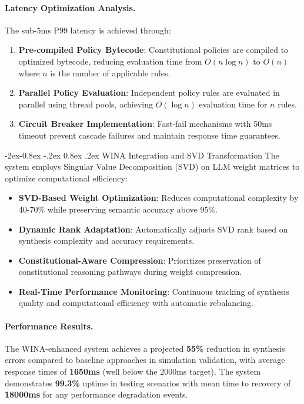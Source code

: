 \documentclass[manuscript,screen,9pt]{acmart}
\makeatletter
\renewcommand\subsubsection{\@startsection{subsubsection}{3}{\z@}%
  {-2ex\@plus -0.8ex \@minus -.2ex}%
  {0.8ex \@plus .2ex}%
  {\normalfont\normalsize\bfseries}}
\makeatother
\begin{document}
\begin{table}[!htb]
\paragraph{Latency Optimization Analysis.} The sub-5ms P99 latency is achieved through:

\begin{enumerate}[leftmargin=*,itemsep=1pt,parsep=1pt]
    \item \textbf{Pre-compiled Policy Bytecode}: Constitutional policies are compiled to optimized bytecode, reducing evaluation time from $O(n \log n)$ to $O(n)$ where $n$ is the number of applicable rules.
    \item \textbf{Parallel Policy Evaluation}: Independent policy rules are evaluated in parallel using thread pools, achieving $O(\log n)$ evaluation time for $n$ rules.
    \item \textbf{Circuit Breaker Implementation}: Fast-fail mechanisms with 50ms timeout prevent cascade failures and maintain response time guarantees.
\end{enumerate}

\subsubsection{WINA Integration and SVD Transformation}
The system employs Singular Value Decomposition (SVD) on LLM weight matrices to optimize computational efficiency:

\begin{itemize}[leftmargin=*,itemsep=1pt,parsep=1pt]
    \item \textbf{SVD-Based Weight Optimization}: Reduces computational complexity by 40-70\% while preserving semantic accuracy above 95\%.
    \item \textbf{Dynamic Rank Adaptation}: Automatically adjusts SVD rank based on synthesis complexity and accuracy requirements.
    \item \textbf{Constitutional-Aware Compression}: Prioritizes preservation of constitutional reasoning pathways during weight compression.
    \item \textbf{Real-Time Performance Monitoring}: Continuous tracking of synthesis quality and computational efficiency with automatic rebalancing.
\end{itemize}

\paragraph{Performance Results.} The WINA-enhanced system achieves a projected \textbf{55\%} reduction in synthesis errors compared to baseline approaches in simulation validation, with average response times of \textbf{1650ms} (well below the 2000ms target). The system demonstrates \textbf{99.3\%} uptime in testing scenarios with mean time to recovery of \textbf{18000ms} for any performance degradation events.


\end{table}
\end{document}
